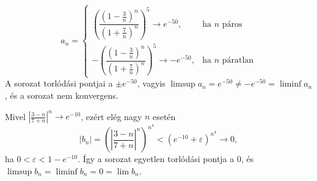\documentclass[11pt]{scrartcl}
\begin{document}
\[
	a_n = \begin{cases}
		\left(
		\dfrac{\left(1 - \frac{3}{n}\right)^n}{\left(1 + \frac{7}{n}\right)^n}
		\right)^5 \to e^{-50},
		 & \text{ha } n \text{ páros}     \\[3ex]
		-\left(
		\dfrac{\left(1 - \frac{3}{n}\right)^n}{\left(1 + \frac{7}{n}\right)^n}
		\right)^5 \to -e^{-50},
		 & \text{ha } n \text{ páratlan}
	\end{cases}
\]
A sorozat torlódási pontjai a $\pm e^{-50}$, vagyis
$\limsup a_n = e^{-50} \ne -e^{-50} = \liminf a_n$, és a sorozat nem
konvergens.

Mivel
\(
\left| \frac{3 - n}{7 + n} \right|^n \to e^{-10}
\),
ezért elég nagy $n$ esetén
\[
	|b_n|
	= \left( \left| \frac{3 - n}{7 + n} \right|^n \right)^{n^4}
	< \left( e^{-10} + \varepsilon \right)^{n^4}
	\to 0,
\]
ha $0 < \varepsilon < 1 - e^{-10}$. Így a sorozat egyetlen torlódási pontja
a $0$, és $\limsup b_n = \liminf b_n = 0 = \lim b_n$.
\end{document}
